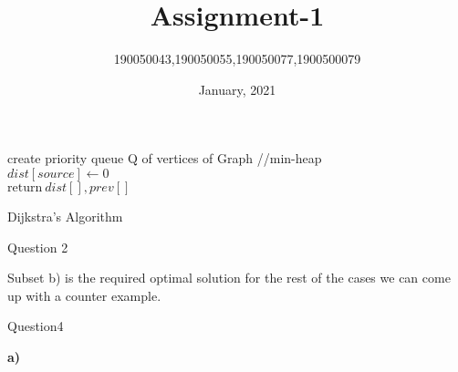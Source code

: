 \documentclass{extarticle}
\theoremstyle{remark}
\newcommand{\tbf}[1]{\textbf{#1}}
\begin{document}
\title{Assignment-1}
\author{190050043,190050055,190050077,1900500079}
\date{January, 2021}
\maketitle
\thispagestyle{empty}
\clearpage
{}

\sffamily

\begin{algorithm}[H]
    \SetAlgoLined
    create priority queue Q of vertices of Graph //min-heap\\
    $dist[source] \gets 0$\\
    $\text{return} ~dist[],prev[]$
    \caption{Dijkstra's Algorithm}
    \end{algorithm}

\Large{Question 2}\\
\normalsize


Subset b) is the required optimal solution for the rest of the cases we can come up
with a counter example.


\Large{Question4}\\
\normalsize

\tbf{a)}\\
\end{document}
